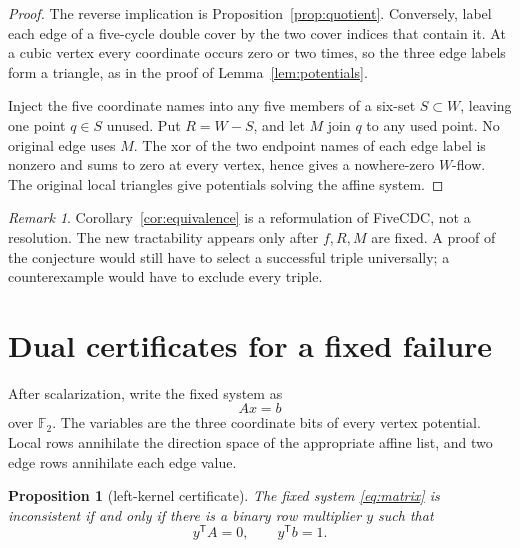 \documentclass[11pt]{article}
\newtheorem{proposition}[theorem]{Proposition}
\theoremstyle{definition}
\theoremstyle{remark}
\newtheorem{remark}[theorem]{Remark}
\newcommand{\F}{\mathbb F}
\newcommand{\FiveCDC}{\textup{FiveCDC}}
\numberwithin{equation}{section}
\begin{document}
\begin{proof}
The reverse implication is Proposition~\ref{prop:quotient}.  Conversely,
label each edge of a five-cycle double cover by the two cover indices
that contain it.  At a cubic vertex every coordinate occurs zero or two
times, so the three edge labels form a triangle, as in the proof of
Lemma~\ref{lem:potentials}.

Inject the five coordinate names into any five members of a six-set
\(S\subset W\), leaving one point \(q\in S\) unused.  Put \(R=W-S\),
and let \(M\) join \(q\) to any used point.  No original edge uses \(M\).
The xor of the two endpoint names of each edge label is nonzero and sums
to zero at every vertex, hence gives a nowhere-zero \(W\)-flow.  The
original local triangles give potentials solving the affine system.
\end{proof}

\begin{remark}
Corollary~\ref{cor:equivalence} is a reformulation of \FiveCDC, not a
resolution.  The new tractability appears only after \(f,R,M\) are
fixed.  A proof of the conjecture would still have to select a successful
triple universally; a counterexample would have to exclude every triple.
\end{remark}

\section{Dual certificates for a fixed failure}

After scalarization, write the fixed system as
\begin{equation}
                              Ax=b
                              \label{eq:matrix}
\end{equation}
over \(\F_2\).  The variables are the three coordinate bits of every
vertex potential.  Local rows annihilate the direction space of the
appropriate affine list, and two edge rows annihilate each edge value.

\begin{proposition}[left-kernel certificate]
\label{prop:dual}
The fixed system \eqref{eq:matrix} is inconsistent if and only if there
is a binary row multiplier \(y\) such that
\begin{equation}
                    y^{\mathsf T}A=0,\qquad
                    y^{\mathsf T}b=1.
                    \label{eq:dual}
\end{equation}
\end{proposition}
\end{document}
